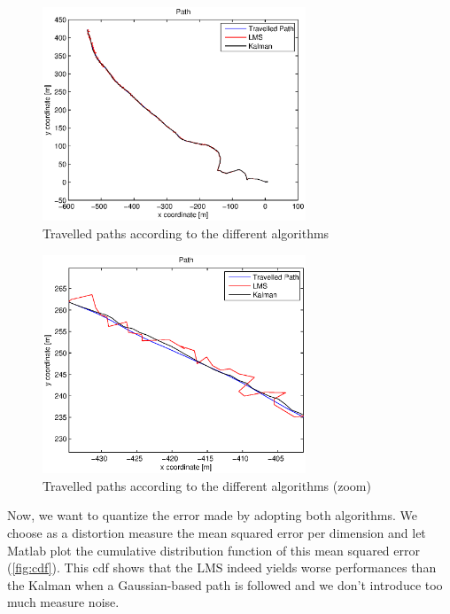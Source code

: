 \documentclass[a4paper]{article}        %
\begin{document}
			\begin{figure}[H]
				\centering
				\includegraphics[width=0.7\textwidth]{images/tracking_algorithms.eps}
				\caption{Travelled paths according to the different algorithms}
				\label{fig:paths}
			\end{figure}

		
			
			\begin{figure}[H]
				\centering
				\includegraphics[width=0.7\textwidth]{images/tracking_algorithms_zoom.eps}
				\caption{Travelled paths according to the different algorithms (zoom)}
				\label{fig:paths_zoom}
			\end{figure}


Now, we want to quantize the error made by adopting both algorithms. We choose as a distortion measure the mean squared error per dimension and let Matlab plot the cumulative distribution function of this mean squared error (\autoref{fig:cdf}). This cdf shows that the LMS indeed yields worse performances than the Kalman when a Gaussian-based path is followed and we don't introduce too much measure noise.
			
\end{document}
